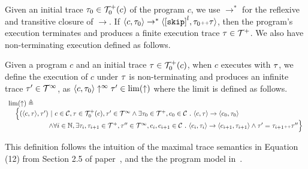 Given an initial trace $\mathtt{\tau}_0 \in \mathcal{T}^{+}_0(c)$ of the program $c$,
we use $\to^*$ for the reflexive and transitive closure of $\to$. 
If $\config{c, \trace_0} \rightarrow^{*} \config{\clabel{\eskip}^l, \trace_0 \tracecat \trace}$,
then the program's execution terminates and produces a finite execution trace $\mathtt{\tau} \in \mathcal{T}^{+}$. We also have non-terminating execution defined as follows.
\begin{defn}
  \label{def:non-terminating}
  Given a program $c$ and an initial trace $\mathtt{\tau} \in \mathcal{T}^{+}_0(c)$,
  when $c$ executes with $\mathtt{\tau}$,  we define the execution of $c$ under $\mathtt{\tau}$ is non-terminating and produces an infinite trace $\mathtt{\tau}' \in \mathcal{T}^{\infty}$, as 
  $\langle c, \mathtt{\tau}_0 \rangle \uparrow^{\infty} \mathtt{\tau}' \in \lim(\uparrow)$
  where the limit is defined as follows.
  \[
    \begin{array}{l}
      \lim(\uparrow) 
      \triangleq 
    \\ \quad
    \Big\{
      (\langle c, \mathtt{\tau} \rangle, \mathtt{\tau}') ~\vert~ 
      c\in \mathcal{C}, \mathtt{\tau} \in \mathcal{T}^{+}_0(c),
      \mathtt{\tau}' \in \mathcal{T}^{\infty} 
      \land \exists \mathtt{\tau}_0 \in \mathcal{T}^{+}, c_0 \in \mathcal{C} ~.~ 
      \langle c, \mathtt{\tau} \rangle \to \langle c_0, \mathtt{\tau}_0 \rangle
      \\ \qquad \qquad \qquad 
      \land \forall i \in \mathbb{N}, \exists \mathtt{\tau}_i, \mathtt{\tau}_{i + 1} \in \mathcal{T}^{+}, \mathtt{\tau}'' \in \mathcal{T}^{\infty}, c_i, c_{i + 1} \in \mathcal{C} ~.~ 
      \langle c_i, \mathtt{\tau}_i \rangle \to \langle c_{i + 1}, \mathtt{\tau}_{i + 1} \rangle 
      \land  \mathtt{\tau}' = \mathtt{\tau}_{i + 1} {\scriptscriptstyle ++} \mathtt{\tau}''
    \Big\}
    \end{array}
  \]
\end{defn}
This definition follows the intuition of the maximal trace semantics in Equation (12) from Section 2.5 of paper~\cite{Cousot19a}, and the the program model in~\cite{SinnZV17}.

